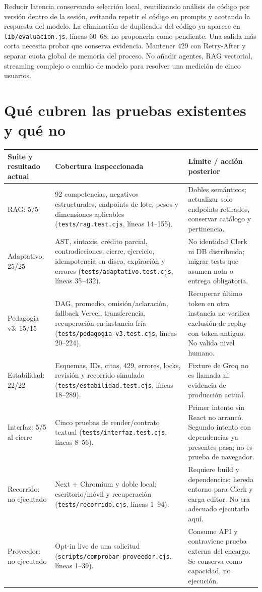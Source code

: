 \documentclass[11pt,a4paper]{report}
\newcommand{\src}[2]{\nolinkurl{#1}, líneas #2}
\begin{document}
Reducir latencia conservando selección local, reutilizando análisis de código por versión dentro de la sesión, evitando repetir el código en prompts y acotando la respuesta del modelo. La eliminación de duplicados del código ya aparece en \src{lib/evaluacion.js}{60--68}; no proponerla como pendiente. Una salida más corta necesita probar que conserva evidencia. Mantener 429 con Retry-After y separar cuota global de memoria del proceso. No añadir agentes, RAG vectorial, streaming complejo o cambio de modelo para resolver una medición de cinco usuarios.

\section{Qué cubren las pruebas existentes y qué no}
\begin{longtable}{P{3.3cm}P{6.3cm}P{6.3cm}}
\toprule Suite y resultado actual & Cobertura inspeccionada & Límite / acción posterior \\\midrule\endhead
RAG: 5/5 & 92 competencias, negativos estructurales, endpoints de lote, pesos y dimensiones aplicables (\src{tests/rag.test.cjs}{14--155}). & Dobles semánticos; actualizar solo endpoints retirados, conservar catálogo y pertinencia.\\
Adaptativo: 25/25 & AST, sintaxis, crédito parcial, contradicciones, cierre, ejercicio, idempotencia en disco, expiración y errores (\src{tests/adaptativo.test.cjs}{35--432}). & No identidad Clerk ni DB distribuida; migrar tests que asumen nota o entrega obligatoria.\\
Pedagogía v3: 15/15 & DAG, promedio, omisión/aclaración, fallback Vercel, transferencia, recuperación en instancia fría (\src{tests/pedagogia-v3.test.cjs}{20--224}). & Recuperar último token en otra instancia no verifica exclusión de replay con token antiguo. No valida nivel humano.\\
Estabilidad: 22/22 & Esquemas, IDs, citas, 429, errores, locks, revisión y recorrido simulado (\src{tests/estabilidad.test.cjs}{18--289}). & Fixture de Groq no es llamada ni evidencia de producción actual.\\
Interfaz: 5/5 al cierre & Cinco pruebas de render/contrato textual (\src{tests/interfaz.test.cjs}{8--56}). & Primer intento sin React no arrancó. Segundo intento con dependencias ya presentes pasa; no es prueba de navegador.\\
Recorrido: no ejecutado & Next + Chromium y doble local; escritorio/móvil y recuperación (\src{tests/recorrido.cjs}{1--94}). & Requiere build y dependencias; hereda entorno para Clerk y carga editor. No era adecuado ejecutarlo aquí.\\
Proveedor: no ejecutado & Opt-in live de una solicitud (\src{scripts/comprobar-proveedor.cjs}{1--39}). & Consume API y contraviene prueba externa del encargo. Se conserva como capacidad, no ejecución.\\\bottomrule
\end{longtable}
\end{document}
